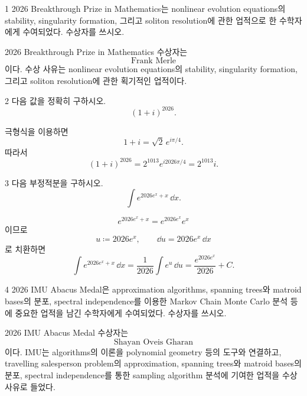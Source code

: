 
\begin{problem}{1}
2026 Breakthrough Prize in Mathematics는 nonlinear evolution equations의 stability, singularity formation, 그리고 soliton resolution에 관한 업적으로 한 수학자에게 수여되었다. 수상자를 쓰시오.
\end{problem}

\begin{solution}
2026 Breakthrough Prize in Mathematics 수상자는
\[
    \boxed{\text{Frank Merle}}
\]
이다. 수상 사유는 nonlinear evolution equations의 stability, singularity formation, 그리고 soliton resolution에 관한 획기적인 업적이다.
\end{solution}

\begin{problem}{2}
다음 값을 정확히 구하시오.
\[
    (1+i)^{2026}.
\]
\end{problem}

\begin{solution}
극형식을 이용하면
\[
    1+i=\sqrt2\,e^{i\pi/4}.
\]
따라서
\[
    (1+i)^{2026}
    =
    2^{1013}e^{i2026\pi/4}
    =
    \boxed{2^{1013}i}.
\]
\end{solution}

\begin{problem}{3}
다음 부정적분을 구하시오.
\[
    \int e^{2026e^x+x}\,\dd x.
\]
\end{problem}

\begin{solution}
\[
    e^{2026e^x+x}
    =
    e^{2026e^x}e^x
\]
이므로
\[
    u\coloneqq 2026e^x,
    \qquad
    \dd u=2026e^x\,\dd x
\]
로 치환하면
\[
    \int e^{2026e^x+x}\,\dd x
    =
    \frac{1}{2026}\int e^u\,\dd u
    =
    \boxed{\frac{e^{2026e^x}}{2026}+C}.
\]
\end{solution}

\begin{problem}{4}
2026 IMU Abacus Medal은 approximation algorithms, spanning trees와 matroid bases의 분포, spectral independence를 이용한 Markov Chain Monte Carlo 분석 등에 중요한 업적을 남긴 수학자에게 수여되었다. 수상자를 쓰시오.
\end{problem}

\begin{solution}
2026 IMU Abacus Medal 수상자는
\[
    \boxed{\text{Shayan Oveis Gharan}}
\]
이다. IMU는 algorithms의 이론을 polynomial geometry 등의 도구와 연결하고, travelling salesperson problem의 approximation, spanning trees와 matroid bases의 분포, spectral independence를 통한 sampling algorithm 분석에 기여한 업적을 수상 사유로 들었다.
\end{solution}

